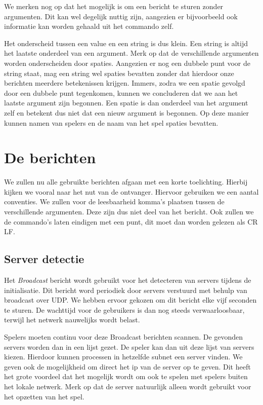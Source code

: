 \documentclass[a4paper,11pt]{article}
\begin{document}
    We merken nog op dat het mogelijk is om een bericht te sturen zonder argumenten. Dit kan wel degelijk nuttig zijn, aangezien er bijvoorbeeld ook informatie kan worden gehaald uit het commando zelf.

    Het onderscheid tussen een value en een string is dus klein. Een string is altijd het laatste onderdeel van een argument. Merk op dat de verschillende argumenten worden onderscheiden door spaties. Aangezien er nog een dubbele punt voor de string staat, mag een string wel spaties bevatten zonder dat hierdoor onze berichten meerdere betekenissen krijgen. Immers, zodra we een spatie gevolgd door een dubbele punt tegenkomen, kunnen we concluderen dat we aan het laatste argument zijn begonnen. Een spatie is dan onderdeel van het argument zelf en betekent dus niet dat een nieuw argument is begonnen. Op deze manier kunnen namen van spelers en de naam van het spel spaties bevatten.

    \section{De berichten}
    We zullen nu alle gebruikte berichten afgaan met een korte toelichting. Hierbij kijken we vooral naar het nut van de ontvanger. Hiervoor gebruiken we een aantal conventies. We zullen voor de leesbaarheid komma's plaatsen tussen de verschillende argumenten. Deze zijn dus niet deel van het bericht. Ook zullen we de commando's laten eindigen met een punt, dit moet dan worden gelezen als CR LF.

    \subsection{Server detectie}
    Het \emph{Broadcast} bericht wordt gebruikt voor het detecteren van servers tijdens de initialisatie. Dit bericht word periodiek door servers verstuurd met behulp van broadcast over UDP. We hebben ervoor gekozen om dit bericht elke vijf seconden te sturen. De wachttijd voor de gebruikers is dan nog steeds verwaarloosbaar, terwijl het netwerk nauwelijks wordt belast. 
    
    Spelers moeten continu voor deze Broadcast berichten scannen. De gevonden servers worden dan in een lijst gezet. De speler kan dan uit deze lijst van servers kiezen. Hierdoor kunnen processen in hetzelfde subnet een server vinden. We geven ook de mogelijkheid om direct het ip van de server op te geven. Dit heeft het grote voordeel dat het mogelijk wordt om ook te spelen met spelers buiten het lokale netwerk. Merk op dat de server natuurlijk alleen wordt gebruikt voor het opzetten van het spel.
    
\end{document}
